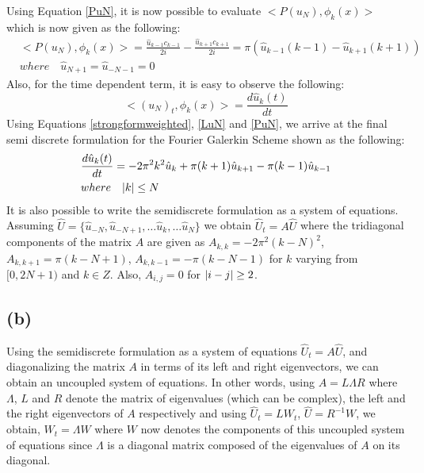 \documentclass[12pt]{article}
\DeclarePairedDelimiter\abs{\lvert}{\rvert}
\begin{document}
Using Equation \ref{PuN}, it is now possible to evaluate $<P(u_N), \phi_k(x)>$ which is now given as the following:
\begin{equation}
\begin{aligned}
    & <P(u_N), \phi_k(x)> = \frac{\hat{u}_{k - 1} c_{k - 1}}{2i} - \frac{\hat{u}_{k + 1} c_{k + 1}}{2i} = \pi\left( \hat{u}_{k - 1}(k - 1) - \hat{u}_{k + 1}(k + 1)  \right) \\
    & where \quad \hat{u}_{N + 1} = \hat{u}_{-N - 1} = 0
\end{aligned}
\label{projection_of_PuN}
\end{equation}
Also, for the time dependent term, it is easy to observe the following:
\begin{equation}
    <(u_N)_t, \phi_k(x)> = \frac{d \hat{u}_k(t)}{dt}
    \label{timedep}
\end{equation}
Using Equations \ref{strongformweighted}, \ref{LuN} and \ref{PuN}, we arrive at the final semi discrete formulation for the Fourier Galerkin Scheme shown as the following:
\begin{equation}
\begin{aligned}
    & \frac{d \hat{u}_k(t)}{dt} = - 2 \pi^2 k^2 \hat{u}_k + \pi (k + 1) \hat{u}_{k + 1} - \pi (k - 1) \hat{u}_{k - 1} \\
    & where \quad \abs{k} \leq N
\end{aligned}
\label{semidiscrete}
\end{equation}
It is also possible to write the semidiscrete formulation as a system of equations. Assuming $\hat{U} = \{ \hat{u}_{-N}, \hat{u}_{-N + 1}, \ldots \hat{u}_k, \ldots \hat{u}_{N} \}$ we obtain $\hat{U}_t = A\hat{U}$ where the tridiagonal components of the matrix $A$ are given as $A_{k,k} = - 2 \pi^2 (k - N)^2$, $A_{k, k+ 1} = \pi (k - N + 1)$, $A_{k, k - 1} = -\pi (k - N - 1)$ for $k$ varying from $[0, 2N + 1)$ and $k \in Z$. Also, $A_{i, j} = 0$ for $\abs{i - j} \geq 2$.

\subsection{(b)}
Using the semidiscrete formulation as a system of equations $\hat{U}_t = A\hat{U}$, and diagonalizing the matrix $A$ in terms of its left and right eigenvectors, we can obtain an uncoupled system of equations. In other words, using $A = L \Lambda R$ where $\Lambda$, $L$ and $R$ denote the matrix of eigenvalues (which can be complex), the left and the right eigenvectors of $A$ respectively and using $\hat{U}_t = LW_t$, $\hat{U} = R^{-1} W$, we obtain, $W_t = \Lambda W$ where $W$ now denotes the components of this uncoupled system of equations since $\Lambda$ is a diagonal matrix composed of the eigenvalues of $A$ on its diagonal. 
\end{document}
